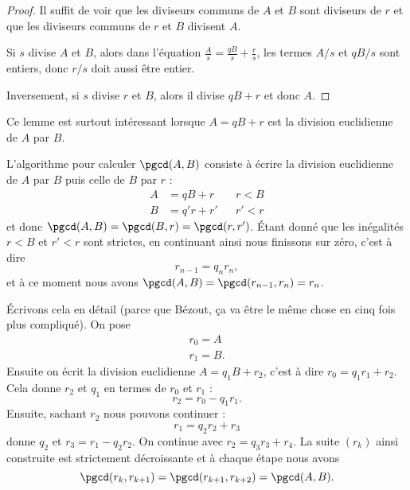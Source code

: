 \begin{proof}
    Il suffit de voir que les diviseurs communs de \( A\) et \( B\) sont diviseurs de \( r\) et que les diviseurs communs de \( r\) et \( B\) divisent \( A\).

    Si \( s\) divise \( A\) et \( B\), alors dans l'équation \( \frac{ A }{ s }=\frac{ qB }{ s }+\frac{ r }{ s }\), les termes \( A/s\) et \( qB/s\) sont entiers, donc \( r/s\) doit aussi être entier.

    Inversement, si \( s\) divise \( r\) et \( B\), alors il divise \( qB+r\) et donc \( A\).
\end{proof}

\begin{remark}
    Ce lemme est surtout intéressant lorsque \( A=qB+r\) est la division euclidienne de \( A\) par \( B\).
\end{remark}

L'algorithme pour calculer \( \pgcd(A,B)\) consiste à écrire la division euclidienne de \( A\) par \( B\) puis celle de \( B\) par \( r\) :
\begin{subequations}
    \begin{align}
        A&=qB+r&&r<B\\
        B&=q'r+r'&&r'<r
    \end{align}
\end{subequations}
et donc \( \pgcd(A,B)=\pgcd(B,r)=\pgcd(r,r')\). Étant donné que les inégalités \( r<B\) et \( r'<r\) sont strictes, en continuant ainsi nous finissons sur zéro, c'est à dire
\begin{equation}
    r_{n-1}=q_nr_n,
\end{equation}
et à ce moment nous avons \( \pgcd(A,B)=\pgcd(r_{n-1},r_n)=r_n\).

Écrivons cela en détail (parce que Bézout, ça va être le même chose en cinq fois plus compliqué). On pose
\begin{subequations}
    \begin{align}
        r_0=A\\
        r_1=B.
    \end{align}
\end{subequations}
Ensuite on écrit la division euclidienne \( A=q_1B+r_2\), c'est à dire \( r_0=q_1r_1+r_2\). Cela donne \( r_2\) et \( q_1\) en termes de \( r_0\) et \( r_1\) :
\begin{equation}
    r_2=r_0-q_1r_1.
\end{equation}
Ensuite, sachant \( r_2\) nous pouvons continuer :
\begin{equation}
    r_1=q_2r_2+r_3
\end{equation}
donne \( q_2\) et \( r_3=r_1-q_2r_2\). On continue avec \( r_2=q_3r_3+r_4\). La suite \( (r_k)\) ainsi construite est strictement décroissante et à chaque étape nous avons
\begin{equation}
    \pgcd(r_k,r_{k+1})=\pgcd(r_{k+1},r_{k+2})=\pgcd(A,B).
\end{equation}

